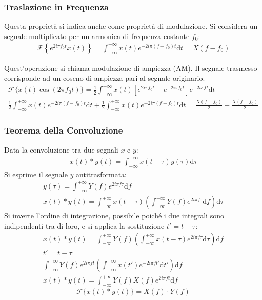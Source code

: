 \documentclass{article}
\newcommand{\df}{\mathrm{d}}
\numberwithin{equation}{subsection}
\begin{document}
\subsubsection{Traslazione in Frequenza}

Questa proprietà si indica anche come proprietà di modulazione. 
Si considera un segnale moltiplicato per un armonica di frequenza costante $f_0$:
\begin{gather}
    \mathscr{F}\left\{e^{2i\pi f_0t}x(t)\right\}=\displaystyle\int_{-\infty}^{+\infty}x(t)e^{-2i\pi(f-f_0)t}\df t=X(f-f_0)
\end{gather}

Quest'operazione si chiama modulazione di ampiezza (AM). Il segnale trasmesso corrisponde ad un coseno di ampiezza pari al segnale originario.
\begin{gather*}
    \mathscr{F}\{x(t)\cos(2\pi f_0t)\}=\displaystyle\frac{1}{2}\int_{-\infty}^{+\infty}x(t)\left[e^{2i\pi f_0t}+e^{-2i\pi f_0t}\right]e^{-2i\pi ft}\df t\\
    \frac{1}{2}\displaystyle\int_{-\infty}^{+\infty}x(t)e^{-2i\pi(f-f_0)t}\df t+\frac{1}{2}\int_{-\infty}^{+\infty}x(t)e^{-2i\pi (f+f_0)t}\df t=\frac{X(f-f_0)}{2}+\frac{X(f+f_0)}{2}
\end{gather*}

\subsubsection{Teorema della Convoluzione}

Data la convoluzione tra due segnali $x$ e $y$:
\begin{gather*}
    x(t)*y(t)=\displaystyle\int_{-\infty}^{+\infty}x(t-\tau)y(\tau)\df\tau
\end{gather*}
Si esprime il segnale $y$ antitrasformata:
\begin{gather*}
    y(\tau)=\displaystyle\int_{-\infty}^{+\infty}Y(f)e^{2i\pi f\tau}\df f\\
    x(t)*y(t)=\displaystyle\int_{-\infty}^{+\infty}x(t-\tau)\left(\int_{-\infty}^{+\infty}Y(f)e^{2i\pi f\tau}\df f\right)\df\tau
\end{gather*}
Si inverte l'ordine di integrazione, possibile poiché i due integrali sono indipendenti tra di loro, e si applica la sostituzione $t'=t-\tau$: 
\begin{gather*}
    x(t)*y(t)=\displaystyle\int_{-\infty}^{+\infty}Y(f)\left(\int_{-\infty}^{+\infty}x(t-\tau)e^{2i\pi f\tau}\df\tau\right)\df f\\
    t'=t-\tau\\
    \int_{-\infty}^{+\infty}Y(f)e^{2i\pi ft}\left(\int_{-\infty}^{+\infty}x(t')e^{-2i\pi ft'}\df t'\right)\df f\\
    x(t)*y(t)=\displaystyle\int_{-\infty}^{+\infty}Y(f)X(f)e^{2i\pi ft}\df f
\end{gather*}
\begin{equation}
    \mathscr{F}\{x(t)*y(t)\}=X(f)\cdot Y(f)
\end{equation}
\end{document}
